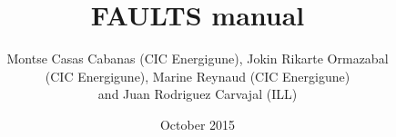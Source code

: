 \documentclass[a4paper,11pt]{report}
\begin{document}
  
\sloppy %
\title{\Huge\bf FAULTS manual}
\author{Montse Casas Cabanas (CIC Energigune), Jokin Rikarte Ormazabal \\
(CIC Energigune), Marine Reynaud (CIC Energigune) \\
and Juan Rodriguez Carvajal (ILL)}
\date{October 2015}
\maketitle
\tableofcontents



%
%
%
\end{document}

